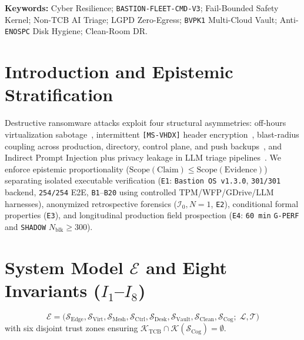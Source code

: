 \documentclass[10pt,twocolumn]{article}
\begin{document}
\vspace{0.4em}
\noindent\textbf{Keywords:} Cyber Resilience; \texttt{BASTION-FLEET-CMD-V3}; Fail-Bounded Safety Kernel; Non-TCB AI Triage; LGPD Zero-Egress; \texttt{BVPK1} Multi-Cloud Vault; Anti-\texttt{ENOSPC} Disk Hygiene; Clean-Room DR.

\section{Introduction and Epistemic Stratification}

Destructive ransomware attacks exploit four structural asymmetries: off-hours virtualization sabotage~\cite{R01,R18,R22}, intermittent \texttt{[MS-VHDX]} header encryption~\cite{R13,R14,R34}, blast-radius coupling across production, directory, control plane, and push backups~\cite{R02,R05,R59,R60}, and Indirect Prompt Injection plus privacy leakage in LLM triage pipelines~\cite{R54,R55,R57,R58}. We enforce epistemic proportionality ($\mathrm{Scope}(\mathrm{Claim}) \le \mathrm{Scope}(\mathrm{Evidence})$) separating isolated executable verification (\texttt{E1}: \texttt{Bastion OS v1.3.0}, \texttt{301/301} backend, \texttt{254/254} E2E, \texttt{B1}--\texttt{B20} using controlled TPM/WFP/GDrive/LLM harnesses), anonymized retrospective forensics ($\mathcal{I}_0, N=1$, \texttt{E2}), conditional formal properties (\texttt{E3}), and longitudinal production field prospection (\texttt{E4}: \texttt{60 min} \texttt{G-PERF} and \texttt{SHADOW} $N_{\mathrm{blk}} \ge 300$).

\section{System Model $\mathcal{E}$ and Eight Invariants ($I_1$--$I_8$)}

\begin{equation}
\mathcal{E} = \bigl(\mathcal{S}_{\mathrm{Edge}}, \mathcal{S}_{\mathrm{Virt}}, \mathcal{S}_{\mathrm{Mesh}}, \mathcal{S}_{\mathrm{Ctrl}}, \mathcal{S}_{\mathrm{Desk}}, \mathcal{S}_{\mathrm{Vault}}, \mathcal{S}_{\mathrm{Clean}}, \mathcal{S}_{\mathrm{Cog}};\; \mathcal{L}, \mathcal{T}\bigr)
\end{equation}
with six disjoint trust zones ensuring $\mathcal{K}_{\mathrm{TCB}} \cap \mathcal{K}(\mathcal{S}_{\mathrm{Cog}}) = \emptyset$.
\end{document}
